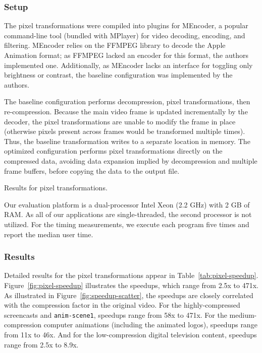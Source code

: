\subsubsection{Setup}

The pixel transformations were compiled into plugins for MEncoder, a
popular command-line tool (bundled with MPlayer) for video decoding,
encoding, and filtering.  MEncoder relies on the FFMPEG library to
decode the Apple Animation format; as FFMPEG lacked an encoder for
this format, the authors implemented one.  Additionally, as MEncoder
lacks an interface for toggling only brightness or contrast, the
baseline configuration was implemented by the authors.

The baseline configuration performs decompression, pixel
transformations, then re-compression.  Because the main video frame is
updated incrementally by the decoder, the pixel transformations are
unable to modify the frame in place (otherwise pixels present across
frames would be transformed multiple times).  Thus, the baseline
transformation writes to a separate location in memory.  The optimized
configuration performs pixel transformations directly on the
compressed data, avoiding data expansion implied by decompression and
multiple frame buffers, before copying the data to the output file.

\begin{table*}[t]
\vspace{-10pt}
\caption{Results for pixel transformations.
\protect\label{tab:pixel-speedup}}
\end{table*}

Our evaluation platform is a dual-processor Intel Xeon (2.2 GHz) with
2 GB of RAM.  As all of our applications are single-threaded, the
second processor is not utilized.  For the timing measurements, we
execute each program five times and report the median user time.

\subsubsection{Results}

Detailed results for the pixel transformations appear in
Table~\ref{tab:pixel-speedup}.  Figure~\ref{fig:pixel-speedup}
illustrates the speedups, which range from 2.5x to 471x.  As
illustrated in Figure~\ref{fig:speedup-scatter}, the speedups are
closely correlated with the compression factor in the original video.
For the highly-compressed screencasts and {\tt anim-scene1}, speedups
range from 58x to 471x.  For the medium-compression computer
animations (including the animated logos), speedups range from 11x to
46x.  And for the low-compression digital television content, speedups
range from 2.5x to 8.9x.

